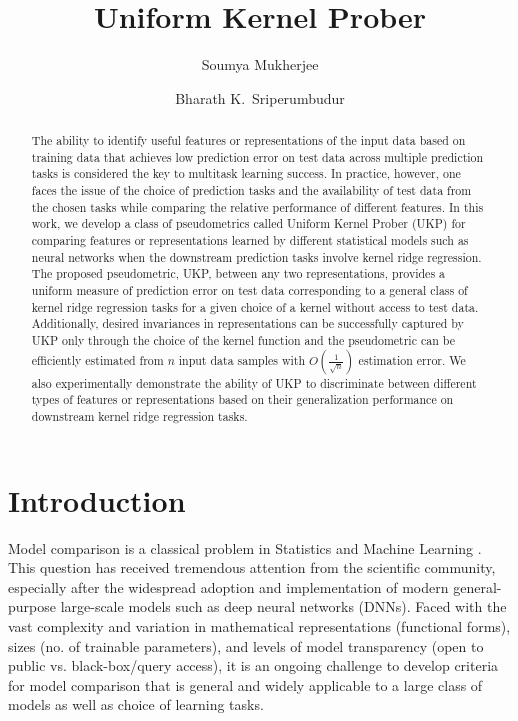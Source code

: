 \documentclass[11pt]{article}
\title{Uniform Kernel Prober}
\author{Soumya Mukherjee}
\author{Bharath K.~Sriperumbudur}
\affil{Department of Statistics\\  
Pennsylvania State University, 
University Park, PA 16802, USA.\\
\texttt{\{szm6510,bks18\}@psu.edu}}
\theoremstyle{plain}
\begin{document}
\maketitle


\begin{abstract}
 The ability to identify useful features or representations of the input data based on training data that achieves low prediction error on test data across multiple prediction tasks is considered the key to multitask learning success. In practice, however, one faces the issue of the choice of prediction tasks and the availability of test data from the chosen tasks while comparing the relative performance of different features. In this work, we develop a class of pseudometrics called Uniform Kernel Prober (UKP) for comparing features or representations learned by different statistical models such as neural networks when the downstream prediction tasks involve kernel ridge regression. The proposed pseudometric, UKP, between any two representations, provides a uniform measure of prediction error on test data corresponding to a general class of kernel ridge regression tasks for a given choice of a kernel without access to test data. Additionally, desired invariances in representations can be successfully captured by UKP only through the choice of the kernel function and the pseudometric can be efficiently estimated from $n$ input data samples with $O(\frac{1}{\sqrt{n}})$ estimation error. We also experimentally demonstrate the ability of UKP to discriminate between different types of features or representations based on their generalization performance on downstream kernel ridge regression tasks.
\end{abstract}

\section{Introduction}

Model comparison is a classical problem in Statistics and Machine Learning \cite{burnham1998practical,pfahringer2000meta,spiegelhalter2002bayesian,caruana2006empirical,fernandez2014we}. This question has received tremendous attention from the scientific community, especially after the widespread adoption and implementation of modern general-purpose large-scale models such as deep neural networks (DNNs). Faced with the vast complexity and variation in mathematical representations (functional forms), sizes (no. of trainable parameters), and levels of model transparency (open to public vs. black-box/query access), it is an ongoing challenge to develop criteria for model comparison that is general and widely applicable to a large class of models as well as choice of learning tasks. 
\end{document}
